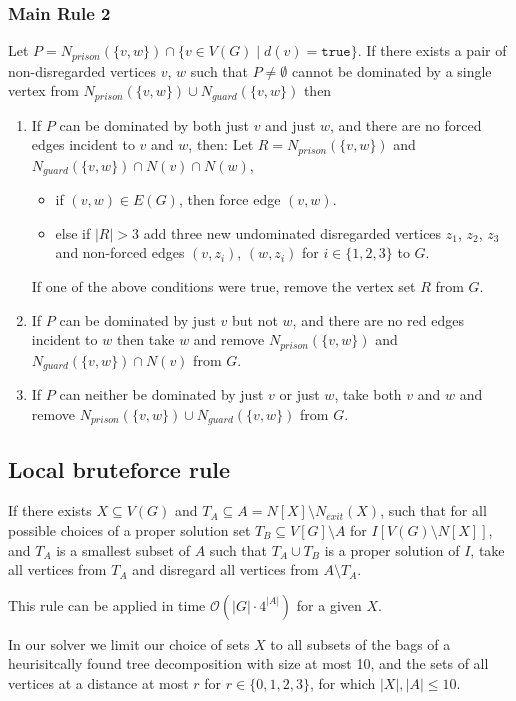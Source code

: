 \documentclass[a4paper,UKenglish,cleveref, autoref, thm-restate]{lipics-v2021}
\begin{document}
\subsubsection{Main Rule 2}
Let $P =  N_{prison}(\{v, w\}) \cap \{v \in V(G) \mid d(v) = \texttt{true}\}$. If there exists a pair of non-disregarded vertices $v$, $w$ such that $P \neq \emptyset$ cannot be dominated by a single vertex from $N_{prison}(\{v, w\}) \cup N_{guard}(\{v, w\})$ then
\begin{enumerate}
\item If $P$ can be dominated by both just $v$ and just $w$, and there are no forced edges incident to $v$ and $w$, then:
    Let $R = N_{prison}(\{v, w\})$ and $N_{guard}(\{v, w\}) \cap N(v) \cap N(w)$,
    \begin{itemize}
        \item if $(v, w) \in E(G)$, then force edge $(v, w)$.
        \item else if $|R| > 3$ add three new undominated disregarded vertices $z_1$, $z_2$, $z_3$ and non-forced edges $(v, z_i)$, $(w, z_i)$ for $i \in \{1, 2, 3\}$ to $G$.
    \end{itemize} 
    If one of the above conditions were true, remove the vertex set $R$ from $G$. 
\item If $P$ can be dominated by just $v$ but not $w$, and there are no red edges incident to $w$ then take $w$ and remove $N_{prison}(\{v, w\})$ and $N_{guard}(\{v, w\}) \cap N(v)$ from $G$.
\item  If $P$ can neither be dominated by just $v$ or just $w$, take both $v$ and $w$ and remove $N_{prison}(\{v, w\}) \cup N_{guard}(\{v, w\})$ from $G$.

\end{enumerate}

\subsection{Local bruteforce rule}
If there exists $X \subseteq V(G)$ and $T_A \subseteq A = N[X] \setminus N_{exit}(X)$, such that for all possible choices of a proper solution set $T_B \subseteq V[G] \setminus A$ for $I[V(G) \setminus N[X]]$,
and $T_A$ is a smallest subset of $A$ such that $T_A \cup T_B$ is a proper solution of $I$,
take all vertices from $T_A$ and disregard all vertices  from $ A \setminus T_A$. 

This rule can be applied in time $\mathcal{O}(|G| \cdot 4^{|A|})$ for a given $X$.

In our solver we limit our choice of sets $X$ to all subsets of the bags of a heurisitcally found tree decomposition with size at most 10, and the sets of all vertices at a distance at most $r$ for $r \in \{0, 1, 2, 3\}$, for which  $|X|, |A| \leq 10$.
\end{document}
